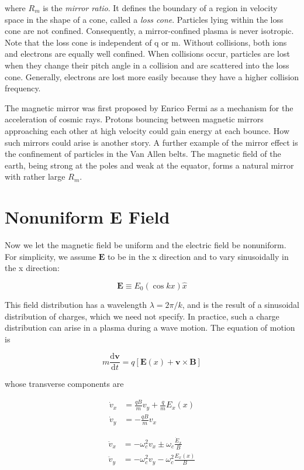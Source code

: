\documentclass[
  notoc %
]{tufte-book}
\begin{document}
where \(R_m\) is the \emph{mirror ratio}. It defines the boundary of a
region in velocity space in the shape of a cone, called a \emph{loss
cone}. Particles lying within the loss cone are not confined.
Consequently, a mirror-confined plasma is never isotropic. Note that the
loss cone is independent of q or m. Without collisions, both ions and
electrons are equally well confined. When collisions occur, particles
are lost when they change their pitch angle in a collision and are
scattered into the loss cone. Generally, electrons are lost more easily
because they have a higher collision frequency.

The magnetic mirror was first proposed by Enrico Fermi as a mechanism
for the acceleration of cosmic rays. Protons bouncing between magnetic
mirrors approaching each other at high velocity could gain energy at
each bounce. How such mirrors could arise is another story. A further
example of the mirror effect is the confinement of particles in the Van
Allen belts. The magnetic field of the earth, being strong at the poles
and weak at the equator, forms a natural mirror with rather large
\(R_m\).

\hypertarget{sec:nonuniform_E}{%
\section{Nonuniform E Field}\label{sec:nonuniform_E}}

Now we let the magnetic field be uniform and the electric field be
nonuniform. For simplicity, we assume \(\mathbf{E}\) to be in the x
direction and to vary sinusoidally in the x direction:

\[
\mathbf{E} \equiv E_0 (\cos kx)\widehat{x}
\]

This field distribution has a wavelength \(\lambda = 2\pi / k\), and is
the result of a sinusoidal distribution of charges, which we need not
specify. In practice, such a charge distribution can arise in a plasma
during a wave motion. The equation of motion is

\[
m\frac{\mathrm{d}\mathbf{v}}{\mathrm{d}t} = q[\mathbf{E}(x) + \mathbf{v}\times\mathbf{B}]
\]

whose transverse components are

\[
\begin{aligned}
\dot{v}_x &= \frac{qB}{m}v_y + \frac{q}{m}E_x(x) \\
\dot{v}_y &= -\frac{qB}{m}v_x
\end{aligned}
\]

\[
\begin{aligned}
\ddot{v}_x &= -\omega_c^2 v_x \pm \omega_c \frac{\dot{E}_x}{B} \\
\ddot{v}_y &= -\omega_c^2 v_y -\omega_c^2\frac{E_x(x)}{B}
\end{aligned}
\]
\end{document}
